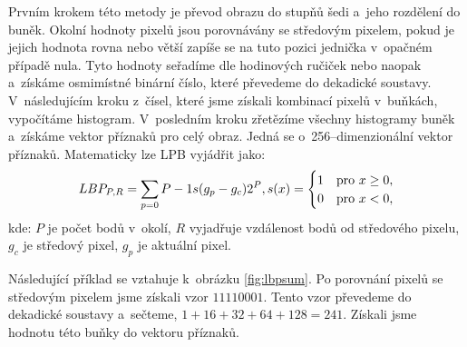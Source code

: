 Prvním krokem této metody je převod obrazu do stupňů šedi a~jeho rozdělení do buněk. Okolní hodnoty pixelů jsou porovnávány se středovým pixelem, pokud je jejich hodnota rovna nebo větší zapíše se na tuto pozici jednička v~opačném případě nula. Tyto hodnoty seřadíme dle hodinových ručiček nebo naopak a~získáme osmimístné binární číslo, které převedeme do dekadické soustavy. V~následujícím kroku z~čísel, které jsme získali kombinací pixelů v~buňkách, vypočítáme histogram. V~posledním kroku zřetězíme všechny histogramy buněk a~získáme vektor příznaků pro celý obraz. Jedná se o~256--dimenzionální vektor příznaků. 
Matematicky lze LPB vyjádřit jako:
\begin{equation*}
LBP_{P,R} = \sum_{p=0}{P-1} s(g_p - g_c)2^P, \\
s(x) =
  \begin{cases} 
   1 & \text{pro } x \geq 0, \\
   0       & \text{pro } x < 0,
  \end{cases}
\end{equation*}
kde: $P$ je počet bodů v~okolí, $R$ vyjadřuje vzdálenost bodů od středového pixelu, $g_c$ je středový pixel, $g_p$ je aktuální pixel. 

Následující příklad se vztahuje k~obrázku \ref{fig:lbpsum}. Po porovnání pixelů se středovým pixelem jsme získali vzor $11110001$. Tento vzor převedeme do dekadické soustavy a~sečteme, $ 1+16+32+64+128 = 241$. Získali jsme hodnotu této buňky do vektoru příznaků.

